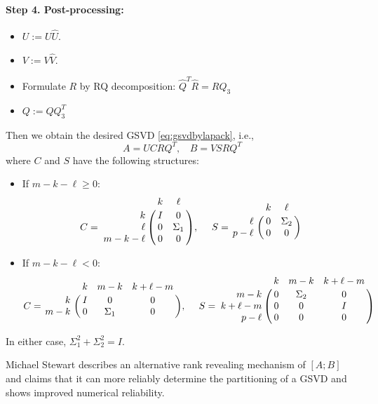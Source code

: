 \paragraph{Step 4. Post-processing:} 
\begin{itemize}
\item $U := U \hat{U}$.
\item $V := V \hat{V}$.
\item Formulate $R$ by RQ decomposition: $\hat{Q}^{T}\hat{R} = RQ_{3}$ 
\item $Q := Q Q_{3}^{T}$
\end{itemize}
Then we obtain the desired GSVD \eqref{eq:gsvdbylapack}, i.e., 
\begin{equation} \label{eq-alg-4}
A = UCRQ^{T}, \ \ \ \ 
B = VSRQ^{T}
\end{equation}
where $C$ and $S$ have the following structures:
    \begin{itemize}
        \item If $m - k - \ell \geq 0$:
            \begin{displaymath}
                C = \bordermatrix{ & k & \ell  \cr
                \hfill k & I & 0 \cr
                \hfill \ell & 0 & \Sigma_1 \cr
                m-k-\ell & 0 & 0}, \  \ \ \
                S = \bordermatrix{ & k & \ell \cr
                \hfill \ell & 0 & \Sigma_2 \cr
                \hfill p-\ell & 0 & 0}
            \end{displaymath}
                
        \item If $m - k - \ell < 0$:
            \begin{displaymath}
                C = \bordermatrix{ & k & m-k & k+\ell-m  \cr
                \hfill k & I & 0 & 0\cr
                \hfill m-k & 0 & \Sigma_1 & 0}, \  \ \ \
                S = \bordermatrix{ & k & m-k & k+\ell-m \cr
                \hfill m-k & 0 & \Sigma_2 & 0\cr
                \hfill k+\ell-m & 0 & 0 & I\cr
                \hfill p-\ell & 0 & 0 & 0}
            \end{displaymath}
    \end{itemize}
    In either case, $\Sigma_1^2 + \Sigma_2^2 = I$.
    
\begin{remark}
{\rm 
Michael Stewart \cite{stewart2016rank} describes 
an alternative rank revealing mechanism of $[A; B]$ 
and claims that it can more reliably determine 
the partitioning of a GSVD and shows improved numerical reliability.
} \end{remark} 

